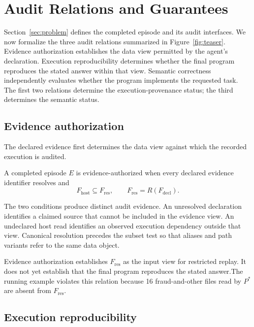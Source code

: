 \section{Audit Relations and Guarantees}
\label{sec:requirements}

Section~\ref{sec:problem} defines the completed episode and its
audit interfaces. We now formalize the three audit relations
summarized in Figure~\ref{fig:teaser}. Evidence authorization
establishes the data view permitted by the agent's declaration.
Execution reproducibility determines whether the final program
reproduces the stated answer within that view. Semantic correctness
independently evaluates whether the program implements the requested
task. The first two relations determine the execution-provenance
status; the third determines the semantic status.

\subsection{Evidence authorization}
\label{sec:authorization}

The declared evidence first determines the data view against which
the recorded execution is audited.

\begin{definition}
\label{def:authorization}
A completed episode $E$ is evidence-authorized when every declared
evidence identifier resolves and
\[
F_{\mathrm{host}}\subseteq F_{\mathrm{res}},
\qquad
F_{\mathrm{res}}=R(F_{\mathrm{decl}}).
\]
\end{definition}

The two conditions produce distinct audit evidence. An unresolved
declaration identifies a claimed source that cannot be included in
the evidence view. An undeclared host read identifies an observed
execution dependency outside that view. Canonical resolution
precedes the subset test so that aliases and path variants refer to
the same data object.

Evidence authorization establishes $F_{\mathrm{res}}$ as the input
view for restricted replay. It does not yet establish that the final
program reproduces the stated answer.The running example violates this relation because 16
fraud-and-other files read by $P^*$ are absent from
$F_{\mathrm{res}}$.

\subsection{Execution reproducibility}
\label{sec:reproducible}

